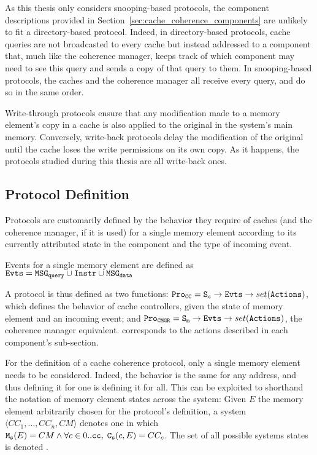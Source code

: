 As this thesis only considers snooping-based protocols, the component
descriptions provided in Section~\ref{sec:cache_coherence_components} are
unlikely to fit a directory-based protocol. Indeed, in directory-based
protocols, cache queries are not broadcasted to every cache but instead
addressed to a component that, much like the coherence manager, keeps track of
which component may need to see this query and sends a copy of that query to
them. In snooping-based protocols, the caches and the coherence manager all
receive every query, and do so in the same order.

Write-through protocols ensure that any modification made to a memory element's
copy in a cache is also applied to the original in the system's main memory.
Conversely, write-back protocols delay the modification of the original until
the cache loses the write permissions on its own copy. As it happens, the
protocols studied during this thesis are all write-back ones.

\subsection{Protocol Definition}
Protocols are customarily defined by the behavior they require of caches (and
the coherence manager, if it is used) for a single memory element according to
its currently attributed state in the component and the type of incoming event.

\begin{definition}[Event]
\label{def:event}
Events for a single memory element are defined as $\text{\texttt{Evts}}{} = \text{\texttt{MSG\textsubscript{query}}}{}
\cup \text{\texttt{Instr}}{} \cup \text{\texttt{MSG\textsubscript{data}}}{}$
\end{definition}

\begin{definition}[Protocol]
\label{def:protocol}
A protocol is thus defined as two functions:
$\text{\texttt{Pro\textsubscript{CC}}}{} = \text{\texttt{S\textsubscript{c}}} \to \text{\texttt{Evts}}{} \to set(\text{\texttt{Actions}}{})$, which
defines the behavior of cache controllers, given the state of memory element
and an incoming event; and
$\text{\texttt{Pro\textsubscript{CMGR}}}{} = \text{\texttt{S\textsubscript{m}}} \to \text{\texttt{Evts}}{} \to set(\text{\texttt{Actions}}{})$,
the coherence manager equivalent. \actions{} corresponds to the actions
described in each component's sub-section.
\end{definition}

\begin{definition}
\label{def:systemstate}
   For the definition of a cache coherence protocol, only a single memory
   element needs to be considered. Indeed, the behavior is the same for any
   address, and thus defining it for one is defining it for all. This can be
   exploited to shorthand the notation of memory element states across the
   system: Given $E$ the memory element arbitrarily chosen for the protocol's
   definition, a system $\langle CC_1, \ldots, CC_n, CM\rangle$ denotes one in
   which
   $
      \coherencemanagerstatefun{}(E) = CM \land
      \forallin{c}{0..\cachecount}{%
         \cachestatefun(c, E) = CC_c
      }
   $. The set of all possible systems states is denoted \systemstate{}.
\end{definition}

